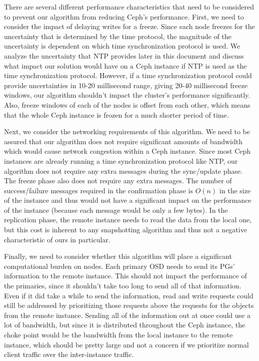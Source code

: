 There are several different performance characteristics that need to
be considered to prevent our algorithm from reducing Ceph's
performance. First, we need to consider the impact of delaying writes
for a freeze. Since each node freezes for the uncertainty that is
determined by the time protocol, the magnitude of the uncertainty is
dependent on which time synchronization protocol is used. We analyze
the uncertainty that NTP provides later in this document and discuss
what impact our solution would have on a Ceph instance if NTP is used
as the time synchronization protocol. However, if a time
synchronization protocol could provide uncertainties in 10-20
millisecond range, giving 20-40 millisecond freeze windows, our
algorithm shouldn’t impact the cluster’s performance
significantly. Also, freeze windows of each of the nodes is offset
from each other, which means that the whole Ceph instance is frozen
for a much shorter period of time.

Next, we consider the networking requirements of this algorithm. We
need to be assured that our algorithm does not require significant
amounts of bandwidth which would cause network congestion within a
Ceph instance. Since most Ceph instances are already running a time
synchronization protocol like NTP, our algorithm does not require any
extra messages during the sync/update phase. The freeze phase also
does not require any extra messages. The number of success/failure
messages required in the confirmation phase is $O(n)$ in the size of
the instance and thus would not have a significant impact on the
performance of the instance (because each message would be only a few
bytes). In the replication phase, the remote instance needs to read
the data from the local one, but this cost is inherent to any
snapshotting algorithm and thus not a negative characteristic of ours
in particular.

Finally, we need to consider whether this algorithm will place a
significant computational burden on nodes. Each primary OSD needs to
send its PGs' information to the remote instance. This should not
impact the performance of the primaries, since it shouldn’t take too
long to send all of that information. Even if it did take a while to
send the information, read and write requests could still be addressed
by prioritizing those requests above the requests for the objects from
the remote instance. Sending all of the information out at once could
use a lot of bandwidth, but since it is distributed throughout the
Ceph instance, the choke point would be the bandwidth from the local
instance to the remote instance, which should be pretty large and not
a concern if we prioritize normal client traffic over the
inter-instance traffic.

